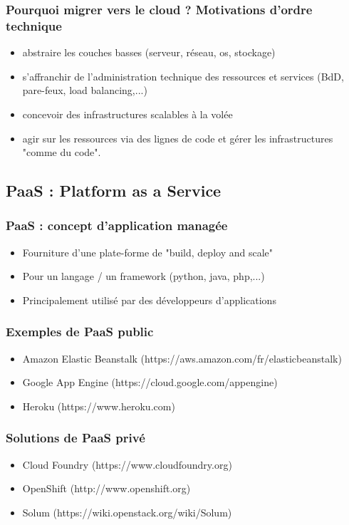  \begin{frame}
    \frametitle{Pourquoi migrer vers le cloud ? Motivations d'ordre technique}
    \begin{itemize}
      \item abstraire les couches basses (serveur, réseau, os, stockage)
      \pause
      \item s'affranchir de l'administration technique des ressources et services (BdD, pare-feux, load balancing,...)
      \pause
      \item concevoir des infrastructures scalables à la volée
      \pause
      \item agir sur les ressources via des lignes de code et gérer les infrastructures "comme du code".
    \end{itemize}
  \end{frame}

  \subsection[PaaS]{PaaS : Platform as a Service}

  \begin{frame}
    \frametitle{PaaS : concept d'application managée}
    \begin{itemize}
      \item Fourniture d'une plate-forme de "build, deploy and scale"
      \pause
      \item Pour un langage / un framework (python, java, php,...)
      \pause
      \item Principalement utilisé par des développeurs d'applications
    \end{itemize}
  \end{frame}

  \begin{frame}
    \frametitle{Exemples de PaaS public}
    \begin{itemize}
      \item Amazon Elastic Beanstalk (https://aws.amazon.com/fr/elasticbeanstalk)
      \pause
      \item Google App Engine (https://cloud.google.com/appengine)
      \pause
      \item Heroku (https://www.heroku.com)
    \end{itemize}
  \end{frame}

  \begin{frame}
    \frametitle{Solutions de PaaS privé}
    \begin{itemize}
      \item Cloud Foundry (https://www.cloudfoundry.org)
      \pause
      \item OpenShift (http://www.openshift.org)
      \pause
      \item \alert<5->{Solum} (https://wiki.openstack.org/wiki/Solum)
    \end{itemize}
  \end{frame}

